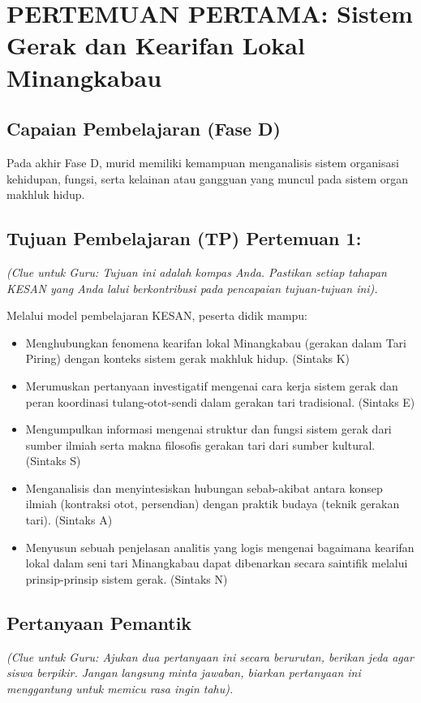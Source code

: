 \documentclass[a4paper,12pt]{article}
\begin{document}
\section{PERTEMUAN PERTAMA: Sistem Gerak dan Kearifan Lokal Minangkabau}

\subsection{Capaian Pembelajaran (Fase D)}
Pada akhir Fase D, murid memiliki kemampuan menganalisis sistem organisasi kehidupan, fungsi, serta kelainan atau gangguan yang muncul pada sistem organ makhluk hidup.

\subsection{Tujuan Pembelajaran (TP) Pertemuan 1:}
\textit{(Clue untuk Guru: Tujuan ini adalah kompas Anda. Pastikan setiap tahapan KESAN yang Anda lalui berkontribusi pada pencapaian tujuan-tujuan ini).}

Melalui model pembelajaran KESAN, peserta didik mampu:
\begin{itemize}
\item Menghubungkan fenomena kearifan lokal Minangkabau (gerakan dalam Tari Piring) dengan konteks sistem gerak makhluk hidup. (Sintaks K)
\item Merumuskan pertanyaan investigatif mengenai cara kerja sistem gerak dan peran koordinasi tulang-otot-sendi dalam gerakan tari tradisional. (Sintaks E)
\item Mengumpulkan informasi mengenai struktur dan fungsi sistem gerak dari sumber ilmiah serta makna filosofis gerakan tari dari sumber kultural. (Sintaks S)
\item Menganalisis dan menyintesiskan hubungan sebab-akibat antara konsep ilmiah (kontraksi otot, persendian) dengan praktik budaya (teknik gerakan tari). (Sintaks A)
\item Menyusun sebuah penjelasan analitis yang logis mengenai bagaimana kearifan lokal dalam seni tari Minangkabau dapat dibenarkan secara saintifik melalui prinsip-prinsip sistem gerak. (Sintaks N)
\end{itemize}

\subsection{Pertanyaan Pemantik}
\textit{(Clue untuk Guru: Ajukan dua pertanyaan ini secara berurutan, berikan jeda agar siswa berpikir. Jangan langsung minta jawaban, biarkan pertanyaan ini menggantung untuk memicu rasa ingin tahu).}
\end{document}
